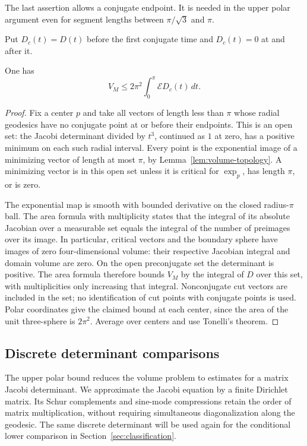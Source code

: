 The last assertion allows a conjugate endpoint. It is needed in the
upper polar argument even for segment lengths between $\pi/\sqrt3$ and
$\pi$.

Put $D_c(t)=D(t)$ before the first conjugate time and $D_c(t)=0$ at and
after it.

\begin{lemma}\label{lem:upper-polar}
One has
\[
 V_M\le2\pi^2\int_0^\pi\mathcal E D_c(t)\,dt.
\]
\end{lemma}
\begin{proof}
Fix a center $p$ and take all vectors of length
less than $\pi$ whose radial geodesics have no conjugate point at or
before their endpoints.  This is an open set: the Jacobi determinant
divided by $t^3$, continued as $1$ at zero, has a positive minimum on
each such radial interval.  Every point is the exponential image of a
minimizing vector of length at most $\pi$, by
Lemma~\ref{lem:volume-topology}.  A minimizing vector is in this open
set unless it is critical for $\exp_p$, has length $\pi$, or is zero.

The exponential map is smooth with bounded derivative on the closed
radius-$\pi$ ball.  The area formula with multiplicity states that the
integral of its absolute Jacobian over a measurable set equals the
integral of the number of preimages over its image.  In particular,
critical vectors and the boundary sphere have images of zero
four-dimensional volume: their respective Jacobian integral and domain
volume are zero.  On the open preconjugate set the determinant is
positive.  The area formula therefore bounds $V_M$ by the integral of
$D$ over this set, with multiplicities only increasing that integral.
Nonconjugate cut vectors are included in the set; no identification of
cut points with conjugate points is used.  Polar coordinates give the
claimed bound at each center, since the area of the unit
three-sphere is $2\pi^2$.  Average over centers and use Tonelli's theorem.

\end{proof}

\subsection{Discrete determinant comparisons}

The upper polar bound reduces the volume problem to estimates for a
matrix Jacobi determinant. We approximate the Jacobi equation by a finite
Dirichlet matrix. Its Schur complements and sine-mode compressions
retain the order of matrix multiplication, without requiring simultaneous diagonalization along the geodesic.
The same discrete determinant will be used again for the conditional
lower comparison in Section~\ref{sec:classification}.

